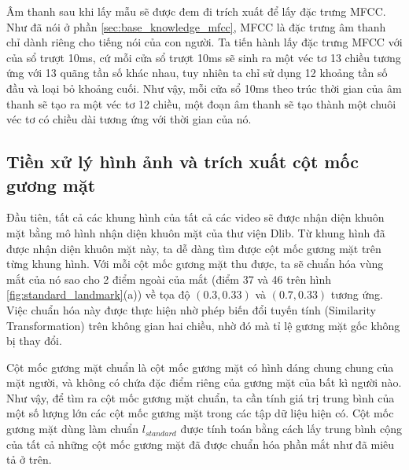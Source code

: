 Âm thanh sau khi lấy mẫu sẽ được đem đi trích xuất để lấy đặc trưng MFCC. Như đã nói ở phần \ref{sec:base_knowledge_mfcc}, MFCC là đặc trưng âm thanh chỉ dành riêng cho tiếng nói của con người. Ta tiến hành lấy đặc trưng MFCC với của sổ trượt 10ms, cứ mỗi cửa sổ trượt 10ms sẽ sinh ra một véc tơ 13 chiều tương ứng với 13 quãng tần số khác nhau, tuy nhiên ta chỉ sử dụng 12 khoảng tần số đầu và loại bỏ khoảng cuối. Như vậy, mỗi cửa sổ 10ms theo trúc thời gian của âm thanh sẽ tạo ra một véc tơ 12 chiều, một đoạn âm thanh sẽ tạo thành một chuôi véc tơ có chiều dài tương ứng với thời gian của nó.

\subsection{Tiền xử lý hình ảnh và trích xuất cột mốc gương mặt}\label{sec:preprocess_audio_lm}

Đầu tiên, tất cả các khung hình của tất cả các video sẽ được nhận diện khuôn mặt bằng mô hình nhận diện khuôn mặt của thư viện Dlib. Từ khung hình đã được nhận diện khuôn mặt này, ta dễ dàng tìm được cột mốc gương mặt trên từng khung hình. Với mỗi cột mốc gương mặt thu được, ta sẽ chuẩn hóa vùng mắt của nó sao cho 2 điểm ngoài của mắt (điểm 37 và 46 trên hình \ref{fig:standard_landmark}(a)) về tọa độ $(0.3, 0.33)$ và $(0.7, 0.33)$ tương ứng. Việc chuẩn hóa này được thực hiện nhờ phép biến đổi tuyến tính (Similarity Transformation) trên không gian hai chiều, nhờ đó mà tỉ lệ gương mặt gốc không bị thay đổi.

Cột mốc gương mặt chuẩn là cột mốc gương mặt có hình dáng chung chung của mặt người, và không có chứa đặc điểm riêng của gương mặt của bất kì người nào. Như vậy, để tìm ra cột mốc gương mặt chuẩn, ta cần tính giá trị trung bình của một số lượng lớn các cột mốc gương mặt trong các tập dữ liệu hiện có. Cột mốc gương mặt dùng làm chuẩn $l_{standard}$ được tính toán bằng cách lấy trung bình cộng của tất cả những cột mốc gương mặt đã được chuẩn hóa phần mắt như đã miêu tả ở trên.

